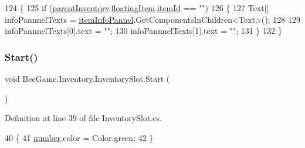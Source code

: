 \begin{DoxyCode}
124         \{
125             \textcolor{keywordflow}{if} (\hyperlink{class_bee_game_1_1_inventory_1_1_inventory_slot_a06c37b35f2512ee2f0652a93129808e4}{parentInventory}.\hyperlink{class_bee_game_1_1_inventory_1_1_inventory_base_aa018ec0acd2aa39dd922f0a1bc1411e6}{floatingItem}.\hyperlink{struct_bee_game_1_1_items_1_1_item_aa85bfeab893271c26f8ca41b638ada1c}{itemId} == \textcolor{stringliteral}{""})
126             \{
127                 Text[] infoPannnelTexts = \hyperlink{class_bee_game_1_1_inventory_1_1_inventory_slot_aa45b9de343c847b7c8d7db4163f765ec}{itemInfoPannel}.GetComponentsInChildren<Text>();
128 
129                 infoPannnelTexts[0].text = \textcolor{stringliteral}{""};
130                 infoPannnelTexts[1].text = \textcolor{stringliteral}{""};
131             \}
132         \}
\end{DoxyCode}
\mbox{\label{class_bee_game_1_1_inventory_1_1_inventory_slot_ae5fe19d6bdefd8c6ceb6800bba276f93}} 
\subsubsection{\texorpdfstring{Start()}{Start()}}
{\footnotesize\ttfamily void Bee\+Game.\+Inventory.\+Inventory\+Slot.\+Start (\begin{DoxyParamCaption}{ }\end{DoxyParamCaption})\hspace{0.3cm}{\ttfamily [private]}}



Definition at line 39 of file Inventory\+Slot.\+cs.


\begin{DoxyCode}
40         \{
41             \hyperlink{class_bee_game_1_1_inventory_1_1_inventory_slot_adbdcece869818ee00193cf27bd9f46d4}{number}.color = Color.green;
42         \}
\end{DoxyCode}
\mbox{\label{class_bee_game_1_1_inventory_1_1_inventory_slot_a30c6d192daefd9e7108cad1bafda814a}} 

